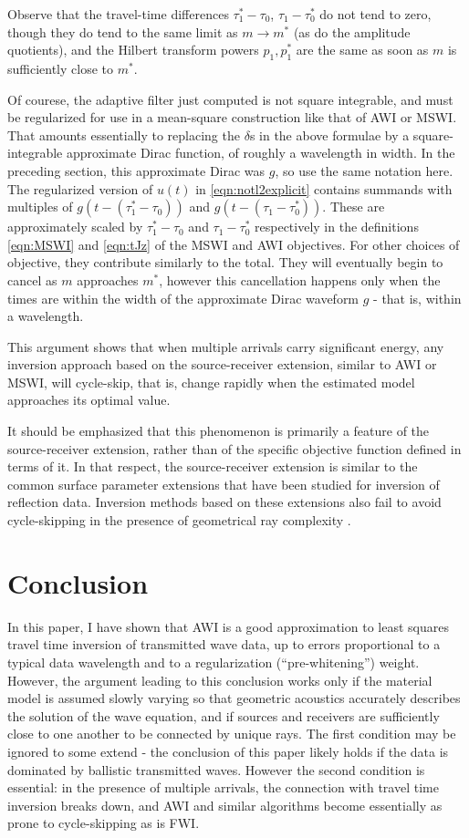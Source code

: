 Observe that the travel-time differences $\tau^*_1-\tau_0$,
$\tau_1-\tau_0^*$ do not tend to zero, though they do tend to the same
limit as $m \rightarrow m^*$ (as do the amplitude quotients), and the
Hilbert transform powers $p_1, p_1^*$ are the same as soon as $m$ is
sufficiently close to $m^*$.

Of courese, the adaptive filter just computed is not square
integrable, and must be regularized for use in a mean-square
construction like that of AWI or MSWI. That amounts essentially to
replacing the $\delta$s in the above formulae by a square-integrable
approximate Dirac function, of roughly a wavelength in width. In the
preceding section, this approximate Dirac was $g$, so use the same
notation here. The regularized version of $u(t)$ in
\ref{eqn:notl2explicit} contains summands with multiples of $g(t-(\tau^*_1-\tau_0))$
and $g(t-(\tau_1-\tau^*_0))$. These are approximately scaled by
$\tau^*_1-\tau_0$ and $\tau_1-\tau^*_0$ respectively in the
definitions \ref{eqn:MSWI} and \ref{eqn:tJz} of the MSWI and AWI
objectives. For other choices of objective, they contribute similarly
to the total. They will eventually begin to cancel as $m$ approaches
$m^*$, however this cancellation happens only when the times are
within the width of the approximate 
Dirac waveform $g$ - that is, within a wavelength.

This argument shows that when multiple arrivals carry significant energy, any
inversion approach based on the source-receiver extension, similar to
AWI or MSWI, will cycle-skip, that is, change rapidly when the
estimated model approaches its optimal value.

It should be emphasized that this phenomenon is primarily a feature of the
source-receiver extension, rather than of the specific objective
function defined in terms of it. In that respect, the source-receiver
extension is similar to the common surface parameter extensions that
have been studied for inversion of reflection data. Inversion methods
based on these extensions also fail to avoid cycle-skipping in the presence of
geometrical ray complexity \cite[]{geoprosp:2008}.

\section{Conclusion}
In this paper, I have shown that AWI is a good approximation to least
squares travel time inversion of transmitted wave data, up to errors proportional to a typical
data wavelength and to a regularization (``pre-whitening'')
weight. However, the argument leading to this conclusion works only if
the material model is assumed slowly varying so that geometric
acoustics accurately describes the solution of the wave equation, and if
sources and receivers are sufficiently close to one another to be
connected by unique rays. The first condition may be ignored to some
extend - the conclusion of this paper likely holds if the data is
dominated by ballistic transmitted waves. However the second condition
is essential: in the presence of multiple arrivals, the connection
with travel time inversion breaks down, and AWI and similar algorithms
become essentially as prone to cycle-skipping as is FWI.





